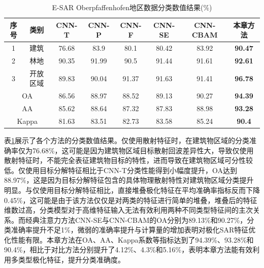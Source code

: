 \begin{table}[ht!]
    \caption{E-SAR Oberpfaffenhofen地区数据分类数值结果(\%)}
    \label{tab:ober_res}
    \begin{tabular}{cccccccc}
        \toprule[1.5bp]
        序号                        & 类别    & CNN-T & CNN-P & CNN-F & CNN-SE & CNN-CBAM       & 本章方法           \\
        \midrule[0.75bp]
        1                         & 建筑    & 76.68 & 83.9  & 80.1  & 80.42  & 83.92          & \textbf{90.47} \\
        2                         & 林地    & 90.35 & 91.99 & 90.5  & 91.44  & 91.61          & \textbf{92.61} \\
        3                         & 开放区域  & 89.83 & 90.04 & 91.37 & 91.63  & 91.41          & \textbf{96.78} \\
        \midrule[0.75bp]
        \multicolumn{2}{c}{OA}    & 86.56 & 88.97 & 88.52 & 89.13 & 90.27  & \textbf{94.39}                  \\
        \multicolumn{2}{c}{AA}    & 85.62 & 88.64 & 87.32 & 87.83 & 88.98  & \textbf{93.28}                  \\
        \multicolumn{2}{c}{Kappa} & 81.63 & 83.51 & 82.73 & 83.58 & 85.24  & \textbf{90.4}                   \\
        \bottomrule[1.5bp]
    \end{tabular}
\end{table}



表\ref{tab:ober_res}展示了各个方法的分类数值结果。仅使用散射特征时，在建筑物区域的分类准确率仅为76.68\%，这可能是因为建筑物区域目标散射回波差异性大，导致仅使用散射特征时，不能完全表征建筑物目标的特性，进而导致在建筑物区域可分性较低。仅使用目标分解特征相比于CNN-T分类性能得到小幅度提升，OA达到88.97\%，这是因为目标分解特征包含的具体物理散射特性对建筑物区域分类提升明显。与仅使用目标分解特征相比，直接堆叠极化特征在平均准确率指标反而下降0.45\%，这可能是由于该方法仅仅是对两类的特征进行简单的堆叠，堆叠后的特征维数过高，分类模型对于高维特征输入无法有效利用两种不同类型特征间的主次关系。而经典注意力方法CNN-SE与CNN-CBAM的OA分别为89.13\%和90.27\%，分类准确率提升不足1\%，微弱的准确率提升与计算量的增加表明对极化SAR特征优化性能有限。本章方法在OA、AA、Kappa系数等指标达到了94.39\%、93.28\%和90.4\%，相比于对比方法分别提升了4.12\%、4.3\%和5.16\%，表明本章方法能有效利用多类型极化特征，提升分类准确度。

